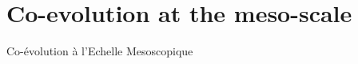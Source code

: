 

\chapter{Co-evolution at the meso-scale}{Co-évolution à l'Echelle Mesoscopique}

\label{ch:mesocoevolution} 


























